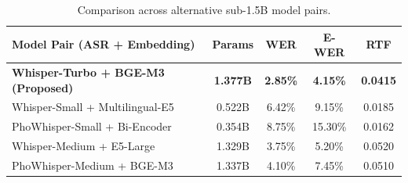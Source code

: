 \documentclass[9pt, conference, a4paper, compsocconf]{IEEEtran}
\begin{document}
\begin{table}[htbp]
\caption{Comparison across alternative sub-1.5B model pairs.}
\label{tab:pairs}
\begin{center}
\begin{tabular}{lcccc}
\toprule
\textbf{Model Pair (ASR + Embedding)} & \textbf{Params} & \textbf{WER} & \textbf{E-WER} & \textbf{RTF} \\
\midrule
\textbf{Whisper-Turbo + BGE-M3 (Proposed)} & \textbf{1.377B} & \textbf{2.85\%} & \textbf{4.15\%} & \textbf{0.0415} \\
Whisper-Small + Multilingual-E5 & 0.522B & 6.42\% & 9.15\% & 0.0185 \\
PhoWhisper-Small + Bi-Encoder & 0.354B & 8.75\% & 15.30\% & 0.0162 \\
Whisper-Medium + E5-Large & 1.329B & 3.75\% & 5.20\% & 0.0520 \\
PhoWhisper-Medium + BGE-M3 & 1.337B & 4.10\% & 7.45\% & 0.0510 \\
\bottomrule
\end{tabular}
\end{center}
\end{table}
\end{document}
